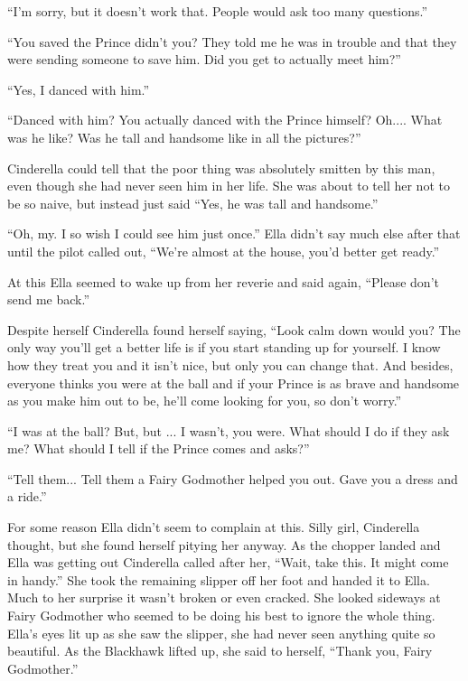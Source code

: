\documentclass[11pt,letterpaper]{article}
\begin{document}
``I'm sorry, but it doesn't work that. People would ask too many questions.''

``You saved the Prince didn't you? They told me he was in trouble and that they were sending someone to save him. Did you get to actually meet him?''

``Yes, I danced with him.''

``Danced with him? You actually danced with the Prince himself? Oh.... What was he like? Was he tall and handsome like in all the pictures?''

Cinderella could tell that the poor thing was absolutely smitten by this man, even though she had never seen him in her life. She was about to tell her not to be so naive, but instead just said ``Yes, he was tall and handsome.''

``Oh, my. I so wish I could see him just once.'' Ella didn't say much else after that until the pilot called out, ``We're almost at the house, you'd better get ready.''

At this Ella seemed to wake up from her reverie and said again, ``Please don't send me back.''

Despite herself Cinderella found herself saying, ``Look calm down would you? The only way you'll get a better life is if you start standing up for yourself. I know how they treat you and it isn't nice, but only you can change that.  And besides, everyone thinks you were at the ball and if your Prince is as brave and handsome as you make him out to be, he'll come looking for you, so don't worry.''

``I was at the ball? But, but ... I wasn't, you were. What should I do if they ask me? What should I tell if the Prince comes and asks?''

``Tell them... Tell them a Fairy Godmother helped you out. Gave you a dress and a ride.''

For some reason Ella didn't seem to complain at this. Silly girl, Cinderella thought, but she found herself pitying her anyway. As the chopper landed and Ella was getting out Cinderella called after her, ``Wait, take this. It might come in handy.'' She took the remaining slipper off her foot and handed it to Ella. Much to her surprise it wasn't broken or even cracked. She looked sideways at Fairy Godmother who seemed to be doing his best to ignore the whole thing. Ella's eyes lit up as she saw the slipper, she had never seen anything quite so beautiful. As the Blackhawk lifted up, she said to herself, ``Thank you, Fairy Godmother.''
\end{document}
